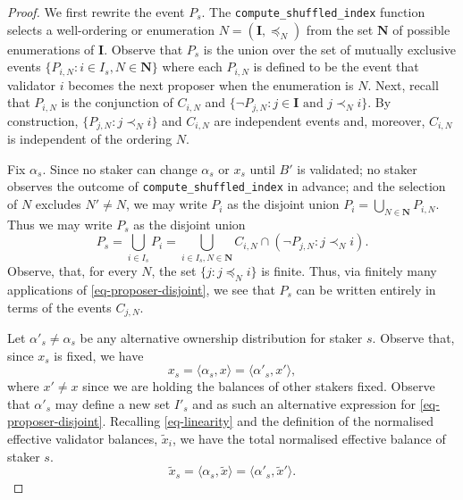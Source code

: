 \documentclass{article}
\newcommand{\eb}{x}
\newcommand{\prob}{\mathbb P}
\newcommand{\teb}{\tilde{\eb}}
\begin{document}
\begin{proof}
  We first rewrite the event $P_s$. The \texttt{compute\_shuffled\_index}
  function selects a well-ordering or enumeration $N = (\mathbf I, \preceq_N)$
  from the set $\mathbf N$ of possible enumerations of $\mathbf I$. Observe
  that $P_s$ is the union over the set of mutually exclusive events $\{P_{i, N}
  : i \in I_s, N \in \mathbf N\}$ where each $P_{i,N}$ is defined to be the
  event that validator $i$ becomes the next proposer when the enumeration is
  $N$. Next, recall that $P_{i, N}$ is the conjunction of $C_{i, N}$ and $\{\neg
  P_{j, N} : j \in \mathbf I \text{ and } j \prec_N i \}$. By construction,
  $\{P_{j, N} : j \prec_{N} i\}$ and $C_{i, N}$ are independent events and,
  moreover, $C_{i, N}$ is independent of the ordering $N$.

  Fix $\alpha_s$. Since no staker can change $\alpha_s$ or $\eb_s$ until $B'$ is
  validated; no staker observes the outcome of
  \texttt{compute\_shuffled\_index} in advance; and the selection of $N$
  excludes $N'\neq N$, we may write $P_i$ as the disjoint union  \(P_i  =
  \bigcup_{N \in \mathbf N} P_{i, N} \). Thus we may write $P_s$ as the
  disjoint union 
  \begin{equation}\label{eq-proposer-disjoint}
  P_s = \bigcup_{i \in I_s} P_i = \bigcup_{i \in I_s, N \in \mathbf N}
   C_{i, N} \cap \left(\neg P_{j, N} : j \prec_{N} i\right).
  \end{equation}
  Observe, that, for every $N$, the set $\{j : j \preceq_N i\}$ is finite.
  Thus, via finitely many applications of \eqref{eq-proposer-disjoint}, we see
  that $P_s$ can be written entirely in terms of the events $C_{j, N}$.

  Let $\alpha'_s \neq \alpha_s$ be any alternative ownership distribution for
  staker $s$. Observe that, since $\eb_s$ is fixed, we have 
  \[
    \eb_s = \langle \alpha_s, \eb \rangle = \langle \alpha'_s, \eb' \rangle,
  \] 
  where $\eb' \neq \eb$ since we are holding the balances of other stakers fixed.
  Observe that $\alpha'_s$ may define a new set $I'_s$ and as such an alternative
  expression for \eqref{eq-proposer-disjoint}.
  Recalling \eqref{eq-linearity} and the definition of the
  normalised effective validator balances, $\teb_i$, we have the total
  normalised effective balance of staker $s$.
  \[
    \teb_s = \langle \alpha_s, \teb\rangle
    = \langle \alpha'_s, \teb'\rangle. 
  \]

\end{proof}
\end{document}
